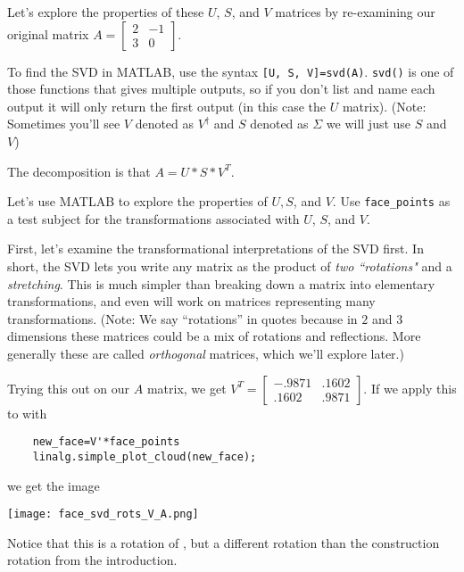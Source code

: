 \documentclass{ximera}
\begin{document}
Let's explore the properties of these $U$, $S$, and $V$ matrices by re-examining our original matrix $A=\begin{bmatrix} 2 & -1 \\ 3 & 0\end{bmatrix}$.

To find the SVD in MATLAB, use the syntax \texttt{[U, S, V]=svd(A)}. \texttt{svd()} is one of those functions that gives multiple outputs, so if you don't list and name each output it will only return the first output (in this case the $U$ matrix). (Note: Sometimes you'll see $V$ denoted as $V^\dagger$ and $S$ denoted as $\Sigma$ we will just use $S$ and $V$)

The decomposition is that $A=U*S*V^{T}$. 



\begin{problem}
Let's use MATLAB to explore the properties of $U, S$, and $V$. Use \texttt{face\_points} as a test subject for the transformations associated with $U$, $S$, and $V$.


First, let's examine the transformational interpretations of the SVD first. In short, the SVD lets you write any matrix as the product of \emph{two ``rotations"} and a \emph{stretching}. This is much simpler than breaking down a matrix into elementary transformations, and even will work on matrices representing many transformations. (Note: We say ``rotations'' in quotes because in $2$ and $3$ dimensions these matrices could be a mix of rotations and reflections. More generally these are called \emph{orthogonal} matrices, which we'll explore later.)


  

  Trying this out on our $A$ matrix, we get $V^T=\begin{bmatrix}
    -.9871 & .1602 \\ .1602 & .9871
  \end{bmatrix}$. If we apply this to \facepoints with

  \begin{verbatim}
    new_face=V'*face_points
    linalg.simple_plot_cloud(new_face);
  \end{verbatim}

  we get the image

    \begin{center}
      \texttt{[image: face\_svd\_rots\_V\_A.png]}
    \end{center}

  Notice that this is a rotation of \facepoints, but a different rotation than the construction rotation from the introduction.


\end{problem}
\end{document}
